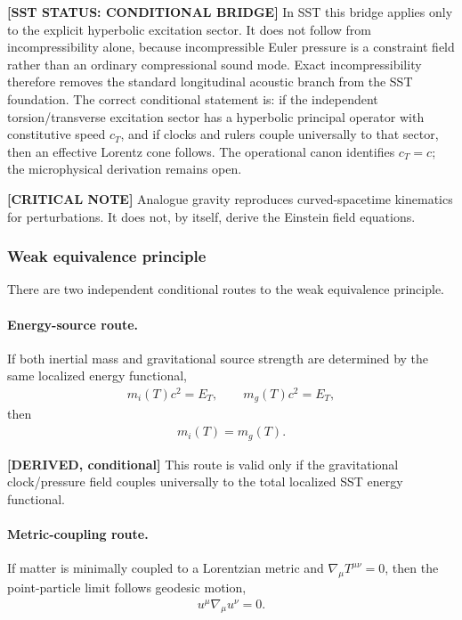 \textbf{[SST STATUS: CONDITIONAL BRIDGE]} In SST this bridge applies only to the
explicit hyperbolic excitation sector. It does not follow from incompressibility
alone, because incompressible Euler pressure is a constraint field rather than
an ordinary compressional sound mode. Exact incompressibility therefore removes
the standard longitudinal acoustic branch from the SST foundation. The correct
conditional statement is: if the independent torsion/transverse excitation
sector has a hyperbolic principal operator with constitutive speed \(c_T\), and
if clocks and rulers couple universally to that sector, then an effective
Lorentz cone follows. The operational canon identifies \(c_T=c\); the
microphysical derivation remains open.

\textbf{[CRITICAL NOTE]} Analogue gravity reproduces curved-spacetime
kinematics for perturbations. It does not, by itself, derive the Einstein field
equations.

\subsubsection{Weak equivalence principle}

There are two independent conditional routes to the weak equivalence principle.

\paragraph{Energy-source route.}
If both inertial mass and gravitational source strength are determined by the
same localized energy functional,
\begin{align}
    m_i(T)c^2 = E_T,
    \qquad
    m_g(T)c^2 = E_T,
\end{align}
then
\begin{align}
    m_i(T)=m_g(T).
\end{align}

\textbf{[DERIVED, conditional]} This route is valid only if the gravitational
clock/pressure field couples universally to the total localized SST energy
functional.

\paragraph{Metric-coupling route.}
If matter is minimally coupled to a Lorentzian metric and
\(\nabla_\mu T^{\mu\nu}=0\), then the point-particle limit follows geodesic
motion,
\begin{align}
    u^\mu \nabla_\mu u^\nu =0 .
\end{align}

